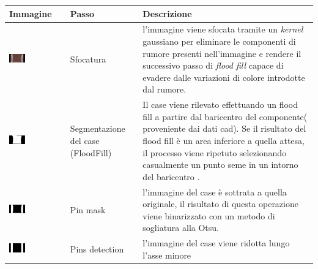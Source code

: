 \begin{tabularx}{\textwidth}{p{.3\linewidth} | p{.16\linewidth} |p{.45\linewidth}}
Immagine & Passo & Descrizione \\
\hline
\vspace{.5mm}
\includegraphics[width=0.3\textwidth]{img/smtcapacitor-sfocatura.png}& Sfocatura & l'immagine viene sfocata tramite un \emph{kernel} gaussiano per eliminare le componenti di rumore presenti nell'immagine e rendere il successivo passo di \emph{flood fill}\cite{Andre05universityof} capace di evadere dalle variazioni di colore introdotte dal rumore.\\
\hline
\vspace{.5mm}
\includegraphics[width=0.3\textwidth]{img/smtcapacitor-ff.png}& Segmentazione del case (FloodFill) & Il case viene rilevato effettuando un flood fill a partire dal baricentro del componente( proveniente dai dati cad). 
Se il risultato del flood fill è un area inferiore a quella attesa, 
il processo viene ripetuto selezionando casualmente un
punto seme in un intorno del baricentro .\\
\hline
\vspace{.5mm}
\includegraphics[width=0.3\textwidth]{img/smtcapacitor-pinmask.png}& Pin mask & l'immagine del case è sottrata a quella originale, il risultato di questa operazione viene binarizzato con un metodo di sogliatura alla Otsu.\\
\hline
\vspace{.5mm}
\includegraphics[width=0.3\textwidth]{img/smtcapacitor-pd.png}& Pins detection & l'immagine del case viene ridotta lungo l'asse minore

\end{tabularx}
